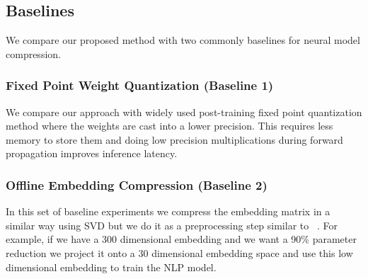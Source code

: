 \subsection{Baselines}
\label{subsec:method_baselines}
We compare our proposed method with two commonly baselines for neural model compression.
\subsubsection{Fixed Point Weight Quantization (Baseline 1)}
We compare our approach with widely used post-training fixed point quantization
\cite{bengio2013estimating,gong2014compressing} method where the weights are
cast into a lower precision. This requires less memory to store them and doing low
precision multiplications during forward propagation improves inference latency.
\subsubsection{Offline Embedding Compression (Baseline 2)}
In this set of baseline experiments we compress the embedding matrix in a
similar way using SVD but we do it as a preprocessing step similar to
~\cite{raunak2017effective,joulin2016fasttext}. For example, if we have a 300
dimensional embedding and we want a 90\% parameter reduction we project it onto
a 30 dimensional embedding space and use this low dimensional embedding to train
the NLP model.





